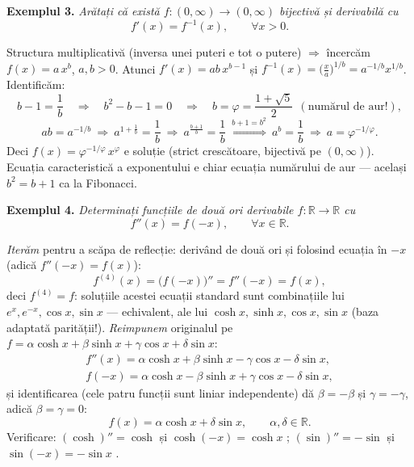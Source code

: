 \medskip
\textbf{Exemplul 3.} \emph{Arătați că există $f:(0,\infty)\to(0,\infty)$ bijectivă și derivabilă cu}
\[
f'(x)=f^{-1}(x),\qquad\forall x>0.
\]

Structura multiplicativă (inversa unei puteri e tot o putere) $\Rightarrow$ încercăm $f(x)=a\,x^{b}$, $a,b>0$. Atunci $f'(x)=ab\,x^{b-1}$ și $f^{-1}(x)=\big(\frac xa\big)^{1/b}=a^{-1/b}x^{1/b}$. Identificăm:
\[
b-1=\frac1b
\quad\Longrightarrow\quad
b^2-b-1=0
\quad\Longrightarrow\quad
b=\varphi=\frac{1+\sqrt5}{2}\ \ (\text{numărul de aur!}),
\]
\[
ab=a^{-1/b}\ \Longrightarrow\ a^{1+\frac1b}=\frac1b\ \Longrightarrow\ a^{\frac{b+1}{b}}=\frac1b
\ \overset{b+1=b^2}{\Longrightarrow}\ a^{b}=\frac1b\ \Longrightarrow\ a=\varphi^{-1/\varphi}.
\]
Deci $f(x)=\varphi^{-1/\varphi}\,x^{\varphi}$ e soluție (strict crescătoare, bijectivă pe $(0,\infty)$). Ecuația caracteristică a exponentului e chiar ecuația numărului de aur --- același $b^2=b+1$ ca la Fibonacci.

\medskip
\textbf{Exemplul 4.} \emph{Determinați funcțiile de două ori derivabile $f:\mathbb{R}\to\mathbb{R}$ cu}
\[
f''(x)=f(-x),\qquad\forall x\in\mathbb{R}.
\]

\emph{Iterăm} pentru a scăpa de reflecție: derivând de două ori și folosind ecuația în $-x$ (adică $f''(-x)=f(x)$):
\[
f^{(4)}(x)=\big(f(-x)\big)''=f''(-x)=f(x),
\]
deci $f^{(4)}=f$: soluțiile acestei ecuații standard sunt combinațiile lui $e^x,e^{-x},\cos x,\sin x$ --- echivalent, ale lui $\cosh x,\sinh x,\cos x,\sin x$ (baza adaptată parității!). \emph{Reimpunem} originalul pe $f=\alpha\cosh x+\beta\sinh x+\gamma\cos x+\delta\sin x$:
\[
\begin{gathered}
f''(x)=\alpha\cosh x+\beta\sinh x-\gamma\cos x-\delta\sin x,\\
f(-x)=\alpha\cosh x-\beta\sinh x+\gamma\cos x-\delta\sin x,
\end{gathered}
\]
și identificarea (cele patru funcții sunt liniar independente) dă $\beta=-\beta$ și $\gamma=-\gamma$, adică $\beta=\gamma=0$:
\[
\boxed{\;f(x)=\alpha\cosh x+\delta\sin x,\qquad\alpha,\delta\in\mathbb{R}.\;}
\]
Verificare: $(\cosh)''=\cosh$ și $\cosh(-x)=\cosh x$ \checkmark; $(\sin)''=-\sin$ și $\sin(-x)=-\sin x$ \checkmark.





